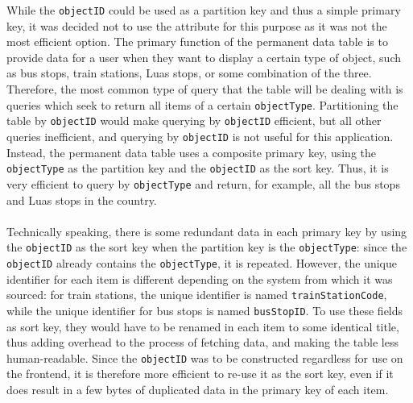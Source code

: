 \documentclass[a4paper,11pt]{report}
\begin{document}
While the \verb|objectID| could be used as a partition key and thus a simple primary key, it was decided not to use the attribute for this purpose as it was not the most efficient option.
The primary function of the permanent data table is to provide data for a user when they want to display a certain type of object, such as bus stops, train stations, Luas stops, or some combination of the three.
Therefore, the most common type of query that the table will be dealing with is queries which seek to return all items of a certain \verb|objectType|.
Partitioning the table by \verb|objectID| would make querying by \verb|objectID| efficient, but all other queries inefficient, and querying by \verb|objectID| is not useful for this application.
Instead, the permanent data table uses a composite primary key, using the \verb|objectType| as the partition key and the \verb|objectID| as the sort key.
Thus, it is very efficient to query by \verb|objectType| and return, for example, all the bus stops and Luas stops in the country.
\\\\
Technically speaking, there is some redundant data in each primary key by using the \verb|objectID| as the sort key when the partition key is the \verb|objectType|: since the \verb|objectID| already contains the \verb|objectType|, it is repeated.
However, the unique identifier for each item is different depending on the system from which it was sourced:
for train stations, the unique identifier is named \verb|trainStationCode|, while the unique identifier for bus stops is named \verb|busStopID|.
To use these fields as sort key, they would have to be renamed in each item to some identical title, thus adding overhead to the process of fetching data, and making the table less human-readable.
Since the \verb|objectID| was to be constructed regardless for use on the frontend, it is therefore more efficient to re-use it as the sort key, even if it does result in a few bytes of duplicated data in the primary key of each item.
\end{document}
